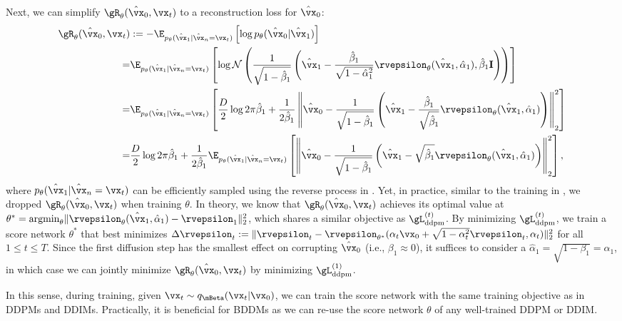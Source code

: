 Next, we can simplify $\gR_\theta(\hat{\vx}_0, \vx_t)$ to a reconstruction loss for $\hat{\vx}_0$:
\begin{align}
    \gR_\theta(\hat{\vx}_0, \vx_t)&:=-\E_{ p_\theta(\hat{\vx}_1|\hat{\vx}_n=\vx_t)}\left[\log p_\theta(\hat{\vx}_{0}|\hat{\vx}_1)\right]\\
    =&\E_{p_\theta(\hat{\vx}_{1}|\hat{\vx}_{n}=\vx_t)}\left[\log\mathcal{N}\left(\frac{1}{\sqrt{1-\hat{\beta}_1}}\left(\hat{\vx}_1-\frac{\hat{\beta}_1}{\sqrt{1-\hat{\alpha}_1^2}}\rvepsilon_\theta(\hat{\vx}_1,\hat{\alpha}_1),\hat{\beta}_1\mathbf{I}\right)\right)\right]\\
    =&\E_{p_\theta(\hat{\vx}_{1}|\hat{\vx}_{n}=\vx_t)}\left[\frac{D}{2}\log 2\pi\hat{\beta}_1+\frac{1}{2\hat{\beta}_1}\left\lVert \hat{\vx}_0-\frac{1}{\sqrt{1-\hat{\beta}_1}}\left(\hat{\vx}_1-\frac{\hat{\beta}_1}{\sqrt{\hat{\beta}_1}}\rvepsilon_\theta(\hat{\vx}_1,\hat{\alpha}_1)\right)\right\rVert_2^2\right]\\
    =&\frac{D}{2}\log 2\pi\hat{\beta}_1+\frac{1}{2\hat{\beta}_1}\E_{p_\theta(\hat{\vx}_{1}|\hat{\vx}_{n}=\vx_t)}\left[\left\lVert \hat{\vx}_0-\frac{1}{\sqrt{1-\hat{\beta}_1}}\left(\hat{\vx}_1-\sqrt{\hat{\beta}_1}\rvepsilon_\theta(\hat{\vx}_1,\hat{\alpha}_1)\right)\right\rVert_2^2\right],
\end{align}
where $p_\theta(\hat{\vx}_{1}|\hat{\vx}_{n}=\vx_t)$ can be efficiently sampled using the reverse process in \citep{jiaming2021}. Yet, in practice, similar to the training in \citep{jiaming2021, nanxin2020, zhifeng2021}, we dropped $\gR_\theta(\hat{\vx}_0, \vx_t)$ when  training $\theta$. In theory, we know that $\gR_\theta(\hat{\vx}_0, \vx_t)$ achieves its optimal value at $\theta^*=\text{argmin}_{\theta}\lVert\rvepsilon_\theta(\hat{\vx}_1,\hat{\alpha}_1)-\rvepsilon_1\rVert^2_2$, which shares a similar objective as $\gL_\text{ddpm}^{(t)}$. By minimizing $\gL_\text{ddpm}^{(t)}$, we train a score network $\theta^*$ that best minimizes $\Delta \rvepsilon_t:=\lVert\rvepsilon_t-\rvepsilon_{\theta^*}( {\alpha}_{t}\vx_{0}+\sqrt{1-{\alpha}_{t}^2}\rvepsilon_{t}, {\alpha}_{t})\rVert^2_2$ for all $1\leq t\leq T$. Since the first diffusion step has the smallest effect on corrupting $\hat{\vx}_0$ (i.e., $\beta_1\approx 0$), it suffices to consider a $\hat{\alpha}_1=\sqrt{1-{\beta}_1}= {\alpha}_1$, in which case we can jointly minimize $\gR_\theta(\hat{\vx}_0, \vx_t)$ by minimizing $\gL_\text{ddpm}^{(1)}$.



In this sense, during training, given $\vx_t\sim q_\mBeta(\vx_{t}|\vx_0)$, we can train the score network with the same training objective as in DDPMs and DDIMs. Practically, it is beneficial for BDDMs as we can re-use the score network $\theta$ of any well-trained DDPM or DDIM.


